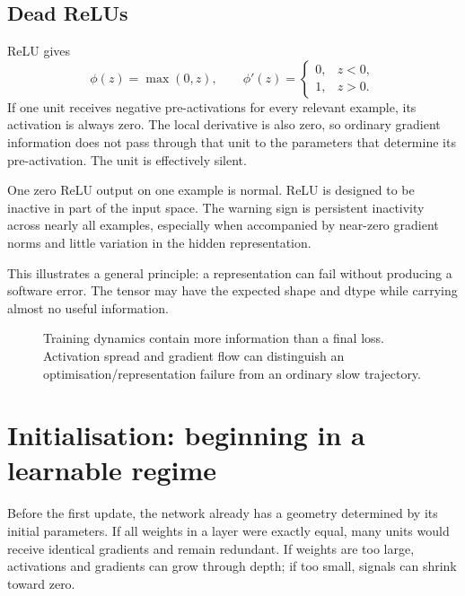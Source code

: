\subsection{Dead ReLUs}

ReLU gives
\[
  \phi(z)=\max(0,z),
\qquad
  \phi'(z)=
  \begin{cases}
    0,& z<0,\\
    1,& z>0.
  \end{cases}
\]
If one unit receives negative pre-activations for every relevant example, its activation is always zero. The local derivative is also zero, so ordinary gradient information does not pass through that unit to the parameters that determine its pre-activation. The unit is effectively silent.

One zero ReLU output on one example is normal. ReLU is designed to be inactive in part of the input space. The warning sign is persistent inactivity across nearly all examples, especially when accompanied by near-zero gradient norms and little variation in the hidden representation.

This illustrates a general principle: a representation can fail without producing a software error. The tensor may have the expected shape and dtype while carrying almost no useful information.

\begin{figure}[ht]
  \caption{Training dynamics contain more information than a final loss. Activation spread and gradient flow can distinguish an optimisation/representation failure from an ordinary slow trajectory.}
  \label{fig:week4-training-diagnostics}
\end{figure}

\section{Initialisation: beginning in a learnable regime}

Before the first update, the network already has a geometry determined by its initial parameters. If all weights in a layer were exactly equal, many units would receive identical gradients and remain redundant. If weights are too large, activations and gradients can grow through depth; if too small, signals can shrink toward zero.

